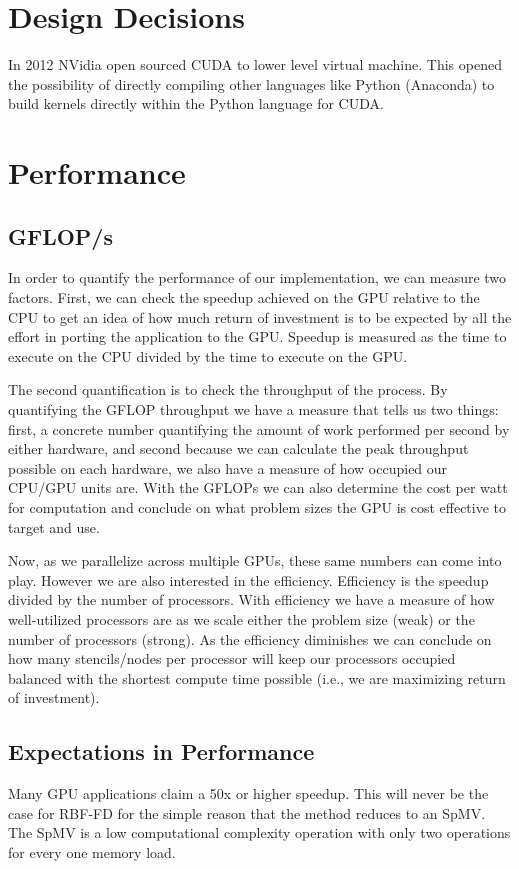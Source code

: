 \documentclass{report}
\begin{document}
\section{Design Decisions}

In 2012 NVidia open sourced CUDA to lower level virtual machine. This opened the possibility of directly compiling other languages like Python (Anaconda) to build kernels directly within the Python language for CUDA. 

\section{Performance}
\subsection{GFLOP/s}
In order to quantify the performance of our implementation, we can measure two
factors. First, we can check the speedup achieved on the GPU relative to the
CPU to get an idea of how much return of investment is to be expected by all
the effort in porting the application to the GPU. Speedup is measured as the
time to execute on the CPU divided by the time to execute on the GPU. 

The second quantification is to check the throughput of the process. By
quantifying the GFLOP throughput we have a measure that tells us two things:
first, a concrete number quantifying the amount of work performed per second by
either hardware, and second because we can calculate the peak throughput possible on
each hardware, we also have a measure of how occupied our CPU/GPU units are.
With the GFLOPs we can also determine the cost per watt for computation and
conclude on what problem sizes the GPU is cost effective to target and use. 

Now, as we parallelize across multiple GPUs, these same numbers can come into
play. However we are also interested in the efficiency. Efficiency is the
speedup divided by the number of processors. With efficiency we have a measure
of how well-utilized processors are as we scale either the problem size (weak)
or the number of processors (strong). As the efficiency diminishes we can
conclude on how many stencils/nodes per processor will keep our processors
occupied balanced with the shortest compute time possible (i.e., we are
maximizing return of investment). 

\subsection{Expectations in Performance}
Many GPU applications claim a 50x or higher speedup. This will never be the case for RBF-FD for the simple reason that the method reduces to an SpMV. The SpMV is a low computational complexity operation with only two operations for every one memory load. 
\end{document}
